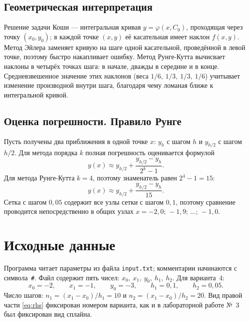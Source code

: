 \documentclass[14pt,a4paper]{extarticle}
\begin{document}
\subsection{Геометрическая интерпретация}

Решение задачи Коши --- интегральная кривая $y=\varphi(x,C_0)$, проходящая
через точку $(x_0,y_0)$; в каждой точке $(x,y)$ её касательная имеет
наклон $f(x,y)$. Метод Эйлера заменяет кривую на шаге одной касательной,
проведённой в левой точке, поэтому быстро накапливает ошибку.
Метод Рунге-Кутта вычисвает наклоны в четырёх точках шага: в начале,
дважды в середине и в конце. Средневзвешенное значение этих наклонов
(веса $1/6,\ 1/3,\ 1/3,\ 1/6$) учитывает изменение производной внутри
шага, благодаря чему ломаная ближе к интегральной кривой.

\subsection{Оценка погрешности. Правило Рунге}

Пусть получены два приближения в одной точке $x$: $y_h$ с шагом $h$ и
$y_{h/2}$ с шагом $h/2$. Для метода порядка $k$ полная погрешность
оценивается формулой
\begin{equation}
    y(x) \approx y_{h/2} + \frac{y_{h/2} - y_h}{2^k - 1} .
    \label{eq:runge}
\end{equation}
Для метода Рунге-Кутта $k=4$, поэтому знаменатель равен $2^4-1=15$:
\begin{equation}
    y(x) \approx y_{h/2} + \frac{y_{h/2} - y_h}{15} .
    \label{eq:runge4}
\end{equation}
Сетка с шагом $0{,}05$ содержит все узлы сетки с шагом $0{,}1$, поэтому
сравнение проводится непосредственно в общих узлах $x=-2{,}0;\,-1{,}9;
\,\ldots;\,-1{,}0$.

\section{Исходные данные}

Программа читает параметры из файла \texttt{input.txt}; комментарии
начинаются с символа~\texttt{\#}. Файл содержит пять чисел:
$x_0,\ x_1,\ y_0,\ h_1,\ h_2$. Для варианта~4:
\begin{equation}
    x_0 = -2,\qquad x_1 = -1,\qquad y_0 = -3,\qquad
    h_1 = 0{,}1,\qquad h_2 = 0{,}05 .
    \label{eq:input}
\end{equation}
Число шагов: $n_1 = (x_1-x_0)/h_1 = 10$ и $n_2 = (x_1-x_0)/h_2 = 20$.
Вид правой части \eqref{eq:rhs} фиксирован номером варианта, как и в
лабораторной работе №~3 был фиксирован вид сплайна.
\end{document}
